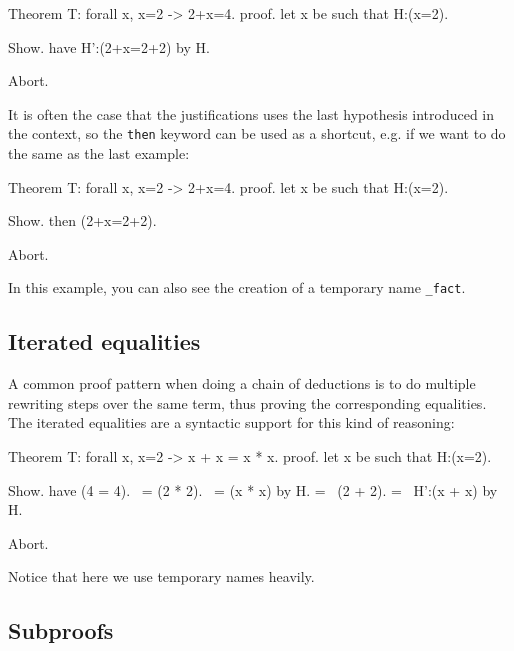 \begin{coq_eval}
Theorem T: forall x, x=2 -> 2+x=4.
proof.
let x be such that H:(x=2).
\end{coq_eval} 
\begin{coq_example}
 Show.
 have H':(2+x=2+2) by H.
\end{coq_example}
\begin{coq_eval}
Abort.
\end{coq_eval}

It is often the case that the justifications uses the last hypothesis
introduced in the context, so the {\tt then} keyword can be used as a
shortcut, e.g. if we want to do the same as the last example:
 
\begin{coq_eval}
Theorem T: forall x, x=2 -> 2+x=4.
proof.
let x be such that H:(x=2).
\end{coq_eval} 
\begin{coq_example}
 Show.
 then (2+x=2+2).
\end{coq_example}
\begin{coq_eval}
Abort.
\end{coq_eval}

In this example, you can also see the creation of a temporary name {\tt \_fact}.

\subsection{Iterated equalities}

A common proof pattern when doing a chain of deductions is to do
multiple rewriting steps over the same term, thus proving the
corresponding equalities. The iterated equalities are a syntactic
support for this kind of reasoning:

\begin{coq_eval}
Theorem T: forall x, x=2 -> x + x = x * x.
proof.
let x be such that H:(x=2).
\end{coq_eval} 
\begin{coq_example}
 Show.
 have (4 = 4).
        ~= (2 * 2).
        ~= (x * x) by H.
        =~ (2 + 2).
        =~ H':(x + x) by H.
\end{coq_example}
\begin{coq_eval}
Abort.
\end{coq_eval}

Notice that here we use temporary names heavily.

\subsection{Subproofs}

